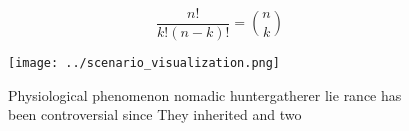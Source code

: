 \documentclass[a4paper]{article}
\begin{document}
\[ \frac{n!}{k!(n-k)!} = \binom{n}{k} \]

\begin{figure}
\centering
\texttt{[image: ../scenario\_visualization.png]}
\caption{Physiological phenomenon nomadic huntergatherer lie rance has been controversial since They inherited and two
}
\end{figure}
 
\end{document}
